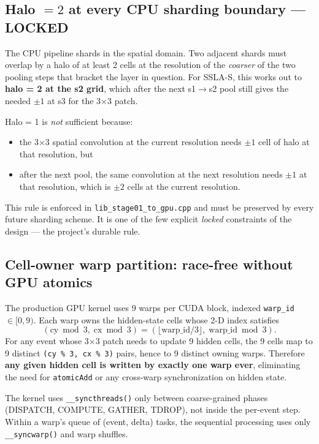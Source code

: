 \documentclass[11pt,a4paper]{article}
\begin{document}
\subsection{Halo $=2$ at every CPU sharding boundary --- LOCKED}

The CPU pipeline shards in the spatial domain. Two adjacent shards must
overlap by a halo of at least 2 cells at the resolution of the
\emph{coarser} of the two pooling steps that bracket the layer in
question. For SSLA-S, this works out to \textbf{halo = 2 at the s2
grid}, which after the next s1\(\to\)s2 pool still gives the needed
$\pm 1$ at s3 for the 3$\times$3 patch.

Halo = 1 is \emph{not} sufficient because:

\begin{itemize}[itemsep=0pt]
  \item the 3$\times$3 spatial convolution at the current resolution
        needs $\pm 1$ cell of halo at that resolution, but
  \item after the next pool, the same convolution at the next
        resolution needs $\pm 1$ at that resolution, which is $\pm 2$
        cells at the current resolution.
\end{itemize}

This rule is enforced in \texttt{lib\_stage01\_to\_gpu.cpp} and must be
preserved by every future sharding scheme. It is one of the few
explicit \emph{locked} constraints of the design --- the project's
durable rule.

\subsection{Cell-owner warp partition: race-free without GPU atomics}

The production GPU kernel uses 9 warps per CUDA block, indexed
\texttt{warp\_id $\in [0,9)$}. Each warp owns the hidden-state cells
whose 2-D index satisfies
\[
  (\mathrm{cy} \bmod 3,\;\mathrm{cx} \bmod 3) = (\lfloor \mathrm{warp\_id}/3 \rfloor,\;\mathrm{warp\_id} \bmod 3).
\]
For any event whose 3$\times$3 patch needs to update 9 hidden cells,
the 9 cells map to 9 distinct \texttt{(cy\,\%\,3, cx\,\%\,3)} pairs,
hence to 9 distinct owning warps. Therefore \textbf{any given hidden
cell is written by exactly one warp ever}, eliminating the need for
\texttt{atomicAdd} or any cross-warp synchronization on hidden state.

The kernel uses \texttt{\_\_syncthreads()} only between coarse-grained
phases (\textsc{DISPATCH}, \textsc{COMPUTE}, \textsc{GATHER},
\textsc{TDROP}), not inside the per-event step. Within a warp's queue
of (event, delta) tasks, the sequential processing uses only
\texttt{\_\_syncwarp()} and warp shuffles.
\end{document}

